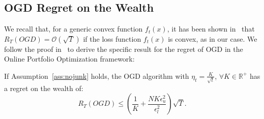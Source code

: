 \subsection{OGD Regret on the Wealth}
We recall that, for a generic convex function $f_t(x)$, it has been shown in~\cite{belmega2018online} that $
R_T(OGD) = \mathcal{O}(\sqrt{T})$ if the loss function $f_t(x)$ is convex, as in our case.
We follow the proof in~\cite{zinkevich2003online} to derive the specific result for the regret of OGD in the Online Portfolio Optimization framework:
\begin{theorem}\label{th:convex_regret_OGD}
    If Assumption~\ref{ass:nojunk} holds, the OGD algorithm with $\eta_t = \frac{K}{\sqrt{t}}$, $\forall K \in \mathbb{R}^+$ has a regret on the wealth of:
    \begin{equation*}
        R_T(OGD) \leq \left( \frac{1}{K} + \frac{N K \epsilon_u^2}{\epsilon_l^2} \right) \sqrt{T}.
    \end{equation*}
\end{theorem}
